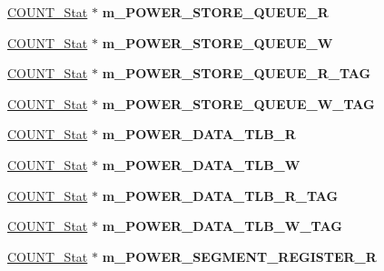 \begin{DoxyCompactItemize}
\item 
\hypertarget{classall__stats__c_a67748c22826d8114fd83ff2f8debe9ca}{
\hyperlink{classCOUNT__Stat}{COUNT\_\-Stat} $\ast$ {\bfseries m\_\-POWER\_\-STORE\_\-QUEUE\_\-R}}
\label{classall__stats__c_a67748c22826d8114fd83ff2f8debe9ca}

\item 
\hypertarget{classall__stats__c_a075bce8f733cf39b01490d9d1aa4064c}{
\hyperlink{classCOUNT__Stat}{COUNT\_\-Stat} $\ast$ {\bfseries m\_\-POWER\_\-STORE\_\-QUEUE\_\-W}}
\label{classall__stats__c_a075bce8f733cf39b01490d9d1aa4064c}

\item 
\hypertarget{classall__stats__c_a4ea684823e5239f89779664938e4ac2a}{
\hyperlink{classCOUNT__Stat}{COUNT\_\-Stat} $\ast$ {\bfseries m\_\-POWER\_\-STORE\_\-QUEUE\_\-R\_\-TAG}}
\label{classall__stats__c_a4ea684823e5239f89779664938e4ac2a}

\item 
\hypertarget{classall__stats__c_a6e3d59f61c4f1f802e88f544ed884586}{
\hyperlink{classCOUNT__Stat}{COUNT\_\-Stat} $\ast$ {\bfseries m\_\-POWER\_\-STORE\_\-QUEUE\_\-W\_\-TAG}}
\label{classall__stats__c_a6e3d59f61c4f1f802e88f544ed884586}

\item 
\hypertarget{classall__stats__c_a65dbe294f2ce3464cbdc667c99b9e329}{
\hyperlink{classCOUNT__Stat}{COUNT\_\-Stat} $\ast$ {\bfseries m\_\-POWER\_\-DATA\_\-TLB\_\-R}}
\label{classall__stats__c_a65dbe294f2ce3464cbdc667c99b9e329}

\item 
\hypertarget{classall__stats__c_a6a564a53518e3881b00859903a3281de}{
\hyperlink{classCOUNT__Stat}{COUNT\_\-Stat} $\ast$ {\bfseries m\_\-POWER\_\-DATA\_\-TLB\_\-W}}
\label{classall__stats__c_a6a564a53518e3881b00859903a3281de}

\item 
\hypertarget{classall__stats__c_a22a6843af9ca6f3dd1b4877e6d909b1d}{
\hyperlink{classCOUNT__Stat}{COUNT\_\-Stat} $\ast$ {\bfseries m\_\-POWER\_\-DATA\_\-TLB\_\-R\_\-TAG}}
\label{classall__stats__c_a22a6843af9ca6f3dd1b4877e6d909b1d}

\item 
\hypertarget{classall__stats__c_a13d276d3a293585de275db48c22419da}{
\hyperlink{classCOUNT__Stat}{COUNT\_\-Stat} $\ast$ {\bfseries m\_\-POWER\_\-DATA\_\-TLB\_\-W\_\-TAG}}
\label{classall__stats__c_a13d276d3a293585de275db48c22419da}

\item 
\hypertarget{classall__stats__c_aba6eb8e2bd415a579ec53d3edd18b211}{
\hyperlink{classCOUNT__Stat}{COUNT\_\-Stat} $\ast$ {\bfseries m\_\-POWER\_\-SEGMENT\_\-REGISTER\_\-R}}
\label{classall__stats__c_aba6eb8e2bd415a579ec53d3edd18b211}


\end{DoxyCompactItemize}
